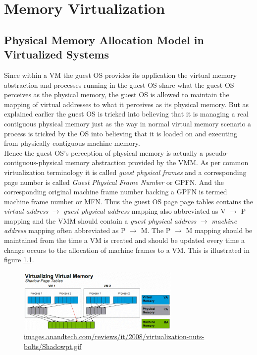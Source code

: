 \chapter{Memory Virtualization}
\section{Physical Memory Allocation Model in Virtualized Systems} \label{model}
Since within a VM the guest OS provides its application the virtual memory abstraction and
processes running in the guest OS share what the guest OS perceives as the physical memory, the
guest OS is allowed to maintain the mapping of virtual addresses to what it perceives as its
physical memory. But as explained earlier the guest OS is tricked into believing that it is
managing a real contiguous physical memory just as the way in normal virtual memory scenario a
process is tricked by the OS into believing that it is loaded on and executing from physically
contiguous machine memory.\\
Hence the guest OS's perception of physical memory is actually a pseudo-contiguous-physical memory
abstraction provided by the VMM. As per common virtualization terminology it is called
\textit{guest physical frames} and a corresponding page number is called \textit{Guest Physical
Frame Number} or GPFN. And the corresponding original machine frame number backing a GPFN is
termed machine frame number or MFN. Thus the guest OS page page tables contains the \textit{virtual address} $\rightarrow$ \textit{guest physical address} mapping also abbreviated as V $\rightarrow$ P mapping and the VMM should contain a \textit{guest physical address} $\rightarrow$ \textit{machine address} mapping often abbreviated as P $\rightarrow$ M. The P $\rightarrow$ M mapping should be maintained from the time a VM is created and should be updated every time a change occurs to the allocation of machine frames to a VM. This is illustrated in figure \ref{fig:allocmodel}.

\begin{figure}[tbp]
  \begin{center}
    \includegraphics[width=0.7\textwidth]{images/allocmodel}
    		{\url{images.anandtech.com/reviews/it/2008/virtualization-nuts-bolts/Shadowpt.gif}}  
    \label{fig:allocmodel}
     \end{center}
\end{figure}

